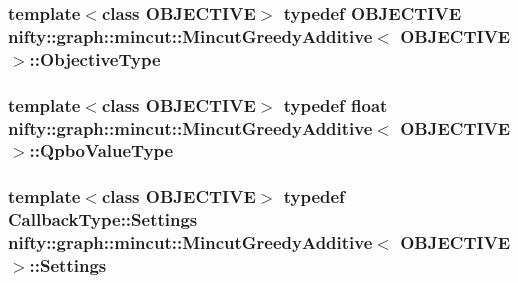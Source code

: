 \subsubsection[{Objective\+Type}]{\setlength{\rightskip}{0pt plus 5cm}template$<$class O\+B\+J\+E\+C\+T\+I\+V\+E$>$ typedef O\+B\+J\+E\+C\+T\+I\+V\+E {\bf nifty\+::graph\+::mincut\+::\+Mincut\+Greedy\+Additive}$<$ O\+B\+J\+E\+C\+T\+I\+V\+E $>$\+::{\bf Objective\+Type}}\label{classnifty_1_1graph_1_1mincut_1_1MincutGreedyAdditive_a589ceb1dbedf182e2b557ce930cd0e88}
\hypertarget{classnifty_1_1graph_1_1mincut_1_1MincutGreedyAdditive_a461d46db5c28a47552377ca8b57db31f}{}
\subsubsection[{Qpbo\+Value\+Type}]{\setlength{\rightskip}{0pt plus 5cm}template$<$class O\+B\+J\+E\+C\+T\+I\+V\+E$>$ typedef float {\bf nifty\+::graph\+::mincut\+::\+Mincut\+Greedy\+Additive}$<$ O\+B\+J\+E\+C\+T\+I\+V\+E $>$\+::{\bf Qpbo\+Value\+Type}}\label{classnifty_1_1graph_1_1mincut_1_1MincutGreedyAdditive_a461d46db5c28a47552377ca8b57db31f}
\hypertarget{classnifty_1_1graph_1_1mincut_1_1MincutGreedyAdditive_a84b2901edebe3443a37f41e1ba254b9d}{}
\subsubsection[{Settings}]{\setlength{\rightskip}{0pt plus 5cm}template$<$class O\+B\+J\+E\+C\+T\+I\+V\+E$>$ typedef Callback\+Type\+::\+Settings {\bf nifty\+::graph\+::mincut\+::\+Mincut\+Greedy\+Additive}$<$ O\+B\+J\+E\+C\+T\+I\+V\+E $>$\+::{\bf Settings}}\label{classnifty_1_1graph_1_1mincut_1_1MincutGreedyAdditive_a84b2901edebe3443a37f41e1ba254b9d}
\hypertarget{classnifty_1_1graph_1_1mincut_1_1MincutGreedyAdditive_a813b2c55104d79a221b9dac3b0343ace}{}
